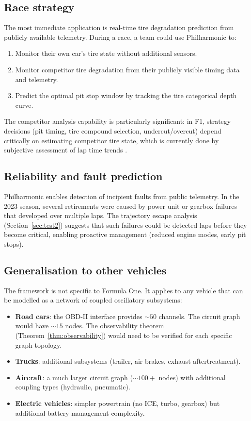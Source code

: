 \documentclass[twocolumn,10pt,a4paper]{article}
\theoremstyle{definition}
\theoremstyle{remark}
\begin{document}
\subsection{Race strategy}

The most immediate application is real-time tire degradation prediction from publicly available telemetry. During a race, a team could use Philharmonic to:
\begin{enumerate}
    \item Monitor their own car's tire state without additional sensors.
    \item Monitor competitor tire degradation from their publicly visible timing data and telemetry.
    \item Predict the optimal pit stop window by tracking the tire categorical depth curve.
\end{enumerate}

The competitor analysis capability is particularly significant: in F1, strategy decisions (pit timing, tire compound selection, undercut/overcut) depend critically on estimating competitor tire state, which is currently done by subjective assessment of lap time trends \citep{Koutrik2014}.

\subsection{Reliability and fault prediction}

Philharmonic enables detection of incipient faults from public telemetry. In the 2023 season, several retirements were caused by power unit or gearbox failures that developed over multiple laps. The trajectory escape analysis (Section~\ref{sec:test2}) suggests that such failures could be detected laps before they become critical, enabling proactive management (reduced engine modes, early pit stops).

\subsection{Generalisation to other vehicles}

The framework is not specific to Formula One. It applies to any vehicle that can be modelled as a network of coupled oscillatory subsystems:
\begin{itemize}
    \item \textbf{Road cars}: the OBD-II interface provides $\sim 50$ channels. The circuit graph would have $\sim 15$ nodes. The observability theorem (Theorem~\ref{thm:observability}) would need to be verified for each specific graph topology.
    \item \textbf{Trucks}: additional subsystems (trailer, air brakes, exhaust aftertreatment).
    \item \textbf{Aircraft}: a much larger circuit graph ($\sim 100+$ nodes) with additional coupling types (hydraulic, pneumatic).
    \item \textbf{Electric vehicles}: simpler powertrain (no ICE, turbo, gearbox) but additional battery management complexity.
\end{itemize}
\end{document}
